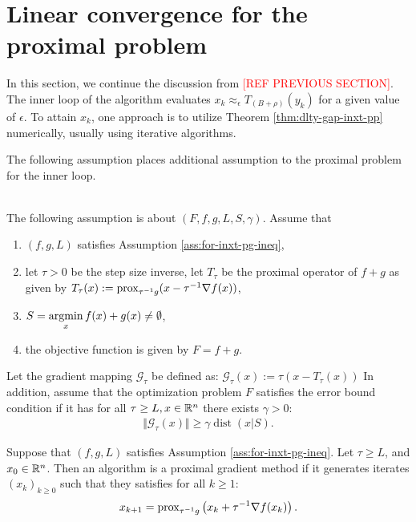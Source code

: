 \documentclass[12pt]{article}
\DeclareMathOperator{\dist}{\mathop{dist}}
\begin{document}
\section{Linear convergence for the proximal problem}
    In this section, we continue the discussion from \textcolor{red}{[REF PREVIOUS SECTION]}. 
    The inner loop of the algorithm evaluates $x_k \approx_\epsilon T_{(B + \rho)}(y_k)$ for a given value of $\epsilon$. 
    To attain $x_k$, one approach is to utilize Theorem \ref{thm:dlty-gap-inxt-pp} numerically, usually using iterative algorithms. 
    \par
    The following assumption places additional assumption to the proximal problem for the inner loop. 
    \begin{assumption}\;\label{ass:pg-eb}\\
        The following assumption is about $(F, f, g, L, S, \gamma)$. 
        Assume that
        \begin{enumerate}[nosep]
            \item $(f, g, L)$ satisfies Assumption \ref{ass:for-inxt-pg-ineq}, 
            \item let $\tau > 0$ be the step size inverse, let $T_{\tau}$ be the proximal operator of $f + g$ as given by $T_{\tau}(x) := \operatorname{prox}_{\tau^{-1}g}(x - \tau^{-1}\nabla f(x))$, 
            \item $S= \mathop{\rm argmin}\limits_{x}{f(x) + g(x)} \neq \emptyset$, 
            \item the objective function is given by $F = f + g$. 
        \end{enumerate}   
        Let the gradient mapping $\mathcal G_{\tau}$ be defined as: $\mathcal G_\tau(x) := \tau (x - T_\tau(x))$     
        In addition, assume that the optimization problem $F$ satisfies the error bound condition if it has for all $\tau \ge L, x \in \mathbb R^n$ there exists $\gamma > 0$: 
        \begin{align*}
            \Vert \mathcal G_\tau(x)\Vert \ge \gamma\dist(x|S). 
        \end{align*}
    \end{assumption}
    \begin{definition}\label{def:ista}
        Suppose that $(f, g, L)$ satisfies Assumption \ref{ass:for-inxt-pg-ineq}. 
        Let $\tau \ge L$, and $x_0 \in \mathbb R^n$. 
        Then an algorithm is a proximal gradient method if it generates iterates $(x_k)_{k \ge 0}$ such that they satisfies for all $k \ge 1$: 
        \begin{align*}
            x_{k + 1} = \operatorname{prox}_{\tau^{-1} g}\left(x_k + \tau^{-1}\nabla f(x_k)\right). 
        \end{align*}
    \end{definition}
\end{document}
